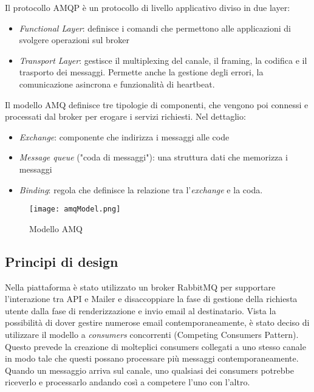 Il protocollo AMQP è un protocollo di livello applicativo diviso in due layer:
\begin{itemize}
    \item \textit{Functional Layer}: definisce i comandi che permettono alle applicazioni di svolgere operazioni sul broker
    \item \textit{Transport Layer}:  gestisce il multiplexing del canale, il framing, la codifica e il trasporto dei messaggi. Permette anche la gestione degli errori, la comunicazione asincrona e funzionalità di heartbeat.
\end{itemize}

Il modello AMQ definisce tre tipologie di componenti, che vengono poi connessi e processati dal broker per erogare i servizi richiesti.
Nel dettaglio:
\begin{itemize}
    \item \textit{Exchange}: componente che indirizza i messaggi alle code
    \item \textit{Message queue} ("coda di messaggi"): una struttura dati che memorizza i messaggi
    \item \textit{Binding}: regola che definisce la relazione tra l'\textit{exchange} e la coda.
\end{itemize}

\begin{figure}[h]
    \centering
    \texttt{[image: amqModel.png]}
    \caption{Modello AMQ}
    \label{fig:AmqModel}
\end{figure}


\subsection{Principi di design}
Nella piattaforma è stato utilizzato un broker RabbitMQ per supportare l'interazione tra API e Mailer e
disaccoppiare la fase di gestione della richiesta utente dalla fase di renderizzazione e invio email al destinatario.
Vista la possibilità di dover gestire numerose email contemporaneamente, è stato deciso di utilizzare il modello a \textit{consumers} concorrenti (Competing Consumers Pattern)\cite{CompetingConsumers}.
Questo prevede la creazione di molteplici consumers collegati a uno stesso canale in modo tale che questi possano processare più messaggi contemporaneamente.
Quando un messaggio arriva sul canale, uno qualsiasi dei consumers potrebbe riceverlo e processarlo andando così a competere l'uno con l'altro.

